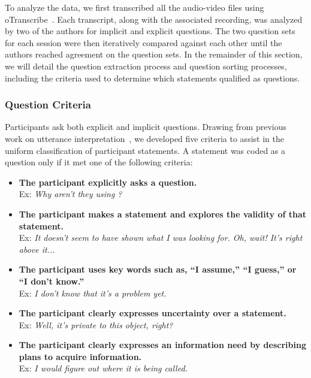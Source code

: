 \documentclass[10pt,journal,compsoc]{IEEEtran}
\newcommand{\compresslist}{
	\vspace{-1em}
	\setlength{\itemsep}{1pt}
	\setlength{\parskip}{0pt}
	\setlength{\parsep}{0pt}
}
\begin{document}
\label{sec:questionAnalysis}
To analyze the data, we first transcribed all the audio-video files using oTranscribe~\cite{OTranscribe}.
Each transcript, along with the associated recording, was analyzed by two of the authors for implicit and explicit questions. 
The two question sets for each session were then iteratively compared against each other until the authors reached agreement on the question sets. 
In the remainder of this section, we will detail the question extraction process and question sorting processes, including the criteria used to determine which statements qualified as questions.
\subsubsection{Question Criteria}
Participants ask both explicit and implicit questions. 
Drawing from previous work on utterance interpretation~\cite{letovsky1987cognitive}, we developed five criteria to assist in the uniform classification of participant statements. 
A statement was coded as a question only if it met one of the following criteria:
\\
\begin{itemize}
\compresslist	
\item \textbf{The participant explicitly asks a question.}
\\ Ex: \textit{Why aren't they using ?}
\item \textbf{The participant makes a statement and explores the validity of that statement.}
\\ Ex: \textit{It doesn't seem to have shown what I was looking for. Oh, wait! It's right above it...}
\item \textbf{The participant uses key words such as, ``I assume,'' ``I guess,'' or ``I don't know.''}
\\ Ex: \textit{I don't know that it's a problem yet.}
\item \textbf{The participant clearly expresses uncertainty over a statement.}
\\ Ex: \textit{Well, it's private to this object, right?}
\item \textbf{The participant clearly expresses an information need by describing plans to acquire information.}
\\ Ex: \textit{I would figure out where it is being called.}

\end{itemize}
\end{document}
